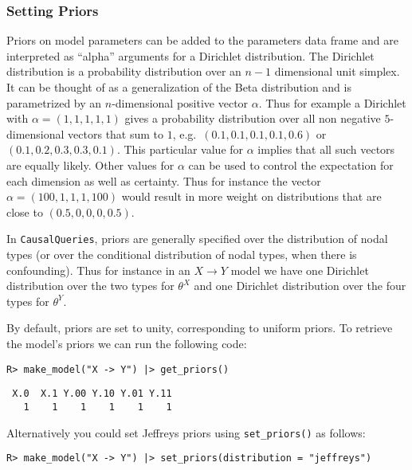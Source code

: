 \documentclass[
  11pt,
  article]{jss}
\begin{document}
\hypertarget{priors}{%
\subsubsection{Setting Priors}\label{priors}}

Priors on model parameters can be added to the parameters data frame and
are interpreted as ``alpha'' arguments for a Dirichlet distribution. The
Dirichlet distribution is a probability distribution over an \(n-1\)
dimensional unit simplex. It can be thought of as a generalization of
the Beta distribution and is parametrized by an \(n\)-dimensional
positive vector \(\alpha\). Thus for example a Dirichlet with
\(\alpha = (1, 1, 1, 1, 1)\) gives a probability distribution over all
non negative \(5\)-dimensional vectors that sum to \(1\),
e.g.~\((0.1, 0.1, 0.1, 0.1, 0.6)\) or \((0.1, 0.2, 0.3, 0.3, 0.1)\).
This particular value for \(\alpha\) implies that all such vectors are
equally likely. Other values for \(\alpha\) can be used to control the
expectation for each dimension as well as certainty. Thus for instance
the vector \(\alpha = (100, 1, 1, 1, 100)\) would result in more weight
on distributions that are close to \((0.5, 0, 0, 0, 0.5)\).

In \texttt{CausalQueries}, priors are generally specified over the
distribution of nodal types (or over the conditional distribution of
nodal types, when there is confounding). Thus for instance in an
\(X \rightarrow Y\) model we have one Dirichlet distribution over the
two types for \(\theta^X\) and one Dirichlet distribution over the four
types for \(\theta^Y\).

By default, priors are set to unity, corresponding to uniform priors. To
retrieve the model's priors we can run the following code:

\begin{verbatim}
R> make_model("X -> Y") |> get_priors()
\end{verbatim}

\begin{verbatim}
 X.0  X.1 Y.00 Y.10 Y.01 Y.11 
   1    1    1    1    1    1 
\end{verbatim}

Alternatively you could set Jeffreys priors using \texttt{set\_priors()}
as follows:

\begin{verbatim}
R> make_model("X -> Y") |> set_priors(distribution = "jeffreys")
\end{verbatim}
\end{document}
